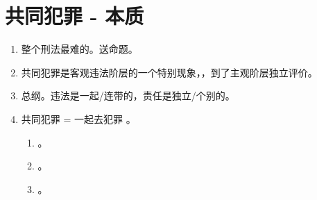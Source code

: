 \section{共同犯罪 - 本质}
\begin{enumerate}
  \item 整个刑法最难的。送命题。
  \item 共同犯罪是客观违法阶层的一个特别现象，，到了主观阶层独立评价。
  \item 总纲。违法是一起/连带的，责任是独立/个别的。
  \item 共同犯罪 = 一起去犯罪 。
        \begin{enumerate}
          \item {}。
          \item {}。
          \item {}。
        \end{enumerate}
\end{enumerate}
